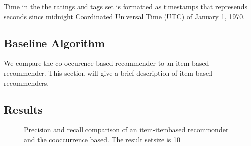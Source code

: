 Time in the the ratings and tags set is formatted as timestamps that represends seconds since midnight Coordinated Universal Time (UTC) of January 1, 1970.

\subsection{Baseline Algorithm}
\label{sec:baselinealgorithm}

We compare the co-occurence based recommender to an item-based recommender. This section will give a brief description of item based recommenders.

\subsection{Results}
\label{sec:results}
\begin{figure}
  \centering
{} 
  \caption{Precision and recall comparison of an item-itembased recommonder and the cooccurrence based. The result setsize is 10}
  \label{fig:results}
\end{figure}
